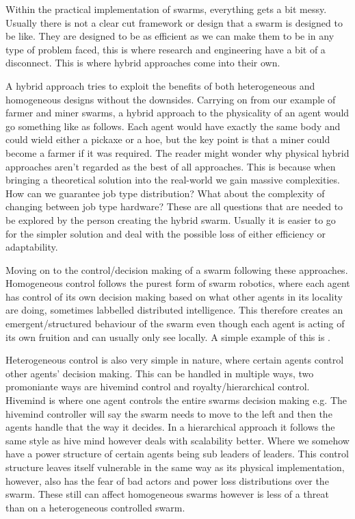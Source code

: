 \documentclass{UoYCSproject}
\begin{document}
Within the practical implementation of swarms, everything gets a bit messy. 
Usually there is not a clear cut framework or design that a swarm is designed to be like. 
They are designed to be as efficient as we can make them to be in any type of problem faced, this is where research and engineering have a bit of a disconnect. 
This is where hybrid approaches come into their own.

A hybrid approach tries to exploit the benefits of both heterogeneous and homogeneous designs without the downsides. 
Carrying on from our example of farmer and miner swarms, a hybrid approach to the physicality of an agent would go something like as follows. 
Each agent would have exactly the same body and could wield either a pickaxe or a hoe, but the key point is that a miner could become a farmer if it was required. 
The reader might wonder why physical hybrid approaches aren’t regarded as the best of all approaches. 
This is because when bringing a theoretical solution into the real-world we gain massive complexities. 
How can we guarantee job type distribution? 
What about the complexity of changing between job type hardware? 
These are all questions that are needed to be explored by the person creating the hybrid swarm. 
Usually it is easier to go for the simpler solution and deal with the possible loss of either efficiency or adaptability.

Moving on to the control/decision making of a swarm following these approaches. 
Homogeneous control follows the purest form of swarm robotics, where each agent has control of its own decision making based on what other agents in its locality are doing, sometimes labbelled distributed intelligence. 
This therefore creates an emergent/structured behaviour of the swarm even though each agent is acting of its own fruition and can usually only see locally. 
A simple example of this is \cite{Boids}.

Heterogeneous control is also very simple in nature, where certain agents control other agents' decision making. 
This can be handled in multiple ways, two promoniante ways are hivemind control \cite{HiveMind} and royalty/hierarchical control. 
Hivemind is where one agent controls the entire swarms decision making e.g. The hivemind controller will say the swarm needs to move to the left and then the agents handle that the way it decides. 
In a hierarchical approach it follows the same style as hive mind however deals with scalability better. 
Where we somehow have a power structure of certain agents being sub leaders of leaders. 
This control structure leaves itself vulnerable in the same way as its physical implementation, however, also has the fear of bad actors and power loss distributions over the swarm. 
These still can affect homogeneous swarms however is less of a threat than on a heterogeneous controlled swarm.
\end{document}
